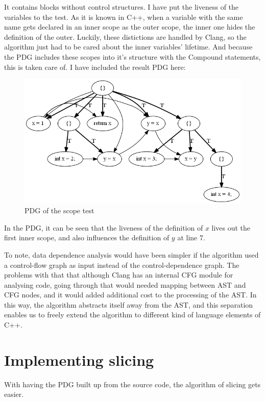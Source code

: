 \documentclass[oneside,12pt,a4paper]{book}
\begin{document}
It contains blocks without control structures. I have put the liveness of the variables to the test. As it is known in C++, when a variable with the same name gets declared in an inner scope as the outer scope, the inner one hides the definition of the outer. Luckily, these distictions are handled by Clang, so the algorithm just had to be cared about the inner variables' lifetime. And because the PDG includes these scopes into it's structure with the Compound statements, this is taken care of.
I have included the result PDG here:
\begin{figure}[h]
\centering
\includegraphics[width=.8\textwidth]{compound_block_test}
\caption{PDG of the scope test}
\label{fig:scope_test}
\end{figure}

In the PDG, it can be seen that the liveness of the definition of $x$ lives out the first inner scope, and also influences the definition of $y$ at line 7.

To note, data dependence analysis would have been simpler if the algorithm used a control-flow graph as input instead of the control-dependence graph. The problems with that that although Clang has an internal CFG module for analysing code, going through that would needed mapping between AST and CFG nodes, and it would added additional cost to the processing of the AST. In this way, the algorithm abstracts itself away from the AST, and this separation enables us to freely extend the algorithm to different kind of language elements of C++.

\section{Implementing slicing}

With having the PDG built up from the source code, the algorithm of slicing gets easier. 
\end{document}

